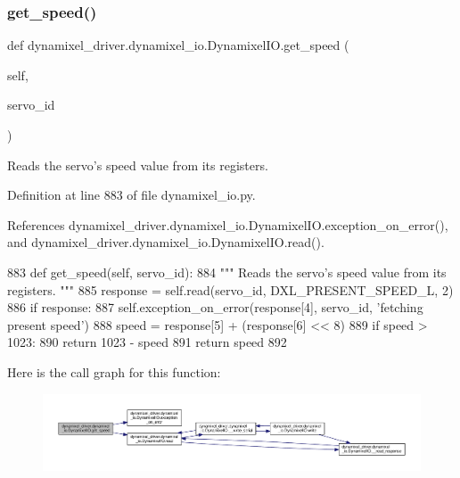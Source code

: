 \subsubsection{\texorpdfstring{get\+\_\+speed()}{get\_speed()}}
{\footnotesize\ttfamily def dynamixel\+\_\+driver.\+dynamixel\+\_\+io.\+Dynamixel\+I\+O.\+get\+\_\+speed (\begin{DoxyParamCaption}\item[{}]{self,  }\item[{}]{servo\+\_\+id }\end{DoxyParamCaption})}

\begin{DoxyVerb}Reads the servo's speed value from its registers. \end{DoxyVerb}
 

Definition at line 883 of file dynamixel\+\_\+io.\+py.



References dynamixel\+\_\+driver.\+dynamixel\+\_\+io.\+Dynamixel\+I\+O.\+exception\+\_\+on\+\_\+error(), and dynamixel\+\_\+driver.\+dynamixel\+\_\+io.\+Dynamixel\+I\+O.\+read().


\begin{DoxyCode}
883     \textcolor{keyword}{def }get\_speed(self, servo\_id):
884         \textcolor{stringliteral}{""" Reads the servo's speed value from its registers. """}
885         response = self.read(servo\_id, DXL\_PRESENT\_SPEED\_L, 2)
886         \textcolor{keywordflow}{if} response:
887             self.exception\_on\_error(response[4], servo\_id, \textcolor{stringliteral}{'fetching present speed'})
888         speed = response[5] + (response[6] << 8)
889         \textcolor{keywordflow}{if} speed > 1023:
890             \textcolor{keywordflow}{return} 1023 - speed
891         \textcolor{keywordflow}{return} speed
892 
\end{DoxyCode}
Here is the call graph for this function\+:
\nopagebreak
\begin{figure}[H]
\begin{center}
\leavevmode
\includegraphics[width=350pt]{dd/d77/classdynamixel__driver_1_1dynamixel__io_1_1_dynamixel_i_o_abe3496d8e3d3dea89509f354b009b326_cgraph}
\end{center}
\end{figure}
\mbox{\label{classdynamixel__driver_1_1dynamixel__io_1_1_dynamixel_i_o_af5a22d82fcdd6fcbe0823c763f7bcc4d}} 
